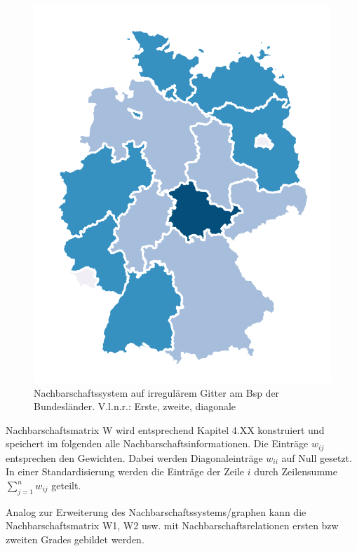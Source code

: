 \begin{figure}
\begin{minipage}[b]{.3\linewidth}
       \includegraphics[width=\linewidth,trim={1cm 1cm 1cm 1cm},clip]{body/figures/73-BL_nb_zd.pdf}
    \end{minipage}
    \caption[Nachbarschaftssysteme]{Nachbarschaftssystem auf irregulärem Gitter am Bsp der Bundesländer. 
    V.l.n.r.: Erste, zweite, diagonale}
    \label{fig_neighbours_bl}
 \end{figure}

Nachbarschaftsmatrix W wird entsprechend Kapitel 4.XX konstruiert und speichert im folgenden alle Nachbarschaftsinformationen. 
Die Einträge $w_{ij}$ entsprechen den Gewichten. Dabei werden Diagonaleinträge $w_{ii}$ auf Null gesetzt. 
In einer Standardisierung werden die Einträge der Zeile $i$ durch Zeilensumme $\sum_{j=1}^{n} w_{ij}$ geteilt.

Analog zur Erweiterung des Nachbarschaftssystems/graphen kann die Nachbarschaftsmatrix W1, W2 usw. 
mit Nachbarschaftsrelationen ersten bzw zweiten Grades gebildet werden.
